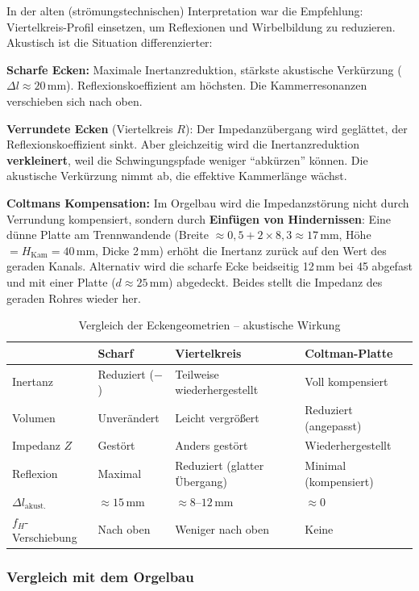 \documentclass[11pt,a4paper]{article}
\begin{document}
In der alten (strömungstechnischen) Interpretation war die Empfehlung: Viertelkreis-Profil einsetzen, um Reflexionen und Wirbelbildung zu reduzieren. Akustisch ist die Situation differenzierter:

\textbf{Scharfe Ecken:} Maximale Inertanzreduktion, stärkste akustische Verkürzung ($\Delta l \approx 20$\,mm). Reflexionskoeffizient am höchsten. Die Kammerresonanzen verschieben sich nach oben.

\textbf{Verrundete Ecken} (Viertelkreis $R$): Der Impedanzübergang wird geglättet, der Reflexionskoeffizient sinkt. Aber gleichzeitig wird die Inertanzreduktion \textbf{verkleinert}, weil die Schwingungspfade weniger ``abkürzen'' können. Die akustische Verkürzung nimmt ab, die effektive Kammerlänge wächst.

\textbf{Coltmans Kompensation:} Im Orgelbau wird die Impedanzstörung nicht durch Verrundung kompensiert, sondern durch \textbf{Einfügen von Hindernissen}: Eine dünne Platte am Trennwandende (Breite $\approx 0{,}5 + 2 \times 8{,}3 \approx 17$\,mm, Höhe $= H_\text{Kam} = 40$\,mm, Dicke 2\,mm) erhöht die Inertanz zurück auf den Wert des geraden Kanals. Alternativ wird die scharfe Ecke beidseitig 12\,mm bei 45\textdegree{} abgefast und mit einer Platte ($d \approx 25$\,mm) abgedeckt. Beides stellt die Impedanz des geraden Rohres wieder her.

\begin{table}[H]
\centering\small
\begin{tabular}{l p{30mm} p{30mm} p{30mm}}
\toprule
& \textbf{Scharf} & \textbf{Viertelkreis} & \textbf{Coltman-Platte} \\
\midrule
Inertanz & Reduziert ($-$) & Teilweise wiederhergestellt & Voll kompensiert \\
Volumen & Unverändert & Leicht vergrößert & Reduziert (angepasst) \\
Impedanz $Z$ & Gestört & Anders gestört & Wiederhergestellt \\
Reflexion & Maximal & Reduziert (glatter Übergang) & Minimal (kompensiert) \\
$\Delta l_\text{akust.}$ & $\approx 15$\,mm & $\approx 8$--$12$\,mm & $\approx 0$ \\
$f_H$-Verschiebung & Nach oben & Weniger nach oben & Keine \\
\bottomrule
\end{tabular}
\caption{Vergleich der Eckengeometrien -- akustische Wirkung}
\end{table}

\subsubsection{Vergleich mit dem Orgelbau}
\end{document}
